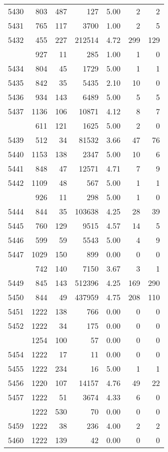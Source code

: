 \documentclass[
]{article}
\begin{document}
\begin{table}
\begin{tabular}[t]{lrrrrrr}
5430 & 803 & 487 & 127 & 5.00 & 2 & 2\\
5431 & 765 & 117 & 3700 & 1.00 & 2 & 5\\
5432 & 455 & 227 & 212514 & 4.72 & 299 & 129\\
\addlinespace
5433 & 927 & 11 & 285 & 1.00 & 1 & 0\\
5434 & 804 & 45 & 1729 & 5.00 & 1 & 1\\
5435 & 842 & 35 & 5435 & 2.10 & 10 & 0\\
5436 & 934 & 143 & 6489 & 5.00 & 5 & 5\\
5437 & 1136 & 106 & 10871 & 4.12 & 8 & 7\\
\addlinespace
5438 & 611 & 121 & 1625 & 5.00 & 2 & 0\\
5439 & 512 & 34 & 81532 & 3.66 & 47 & 76\\
5440 & 1153 & 138 & 2347 & 5.00 & 10 & 6\\
5441 & 848 & 47 & 12571 & 4.71 & 7 & 9\\
5442 & 1109 & 48 & 567 & 5.00 & 1 & 1\\
\addlinespace
5443 & 926 & 11 & 298 & 5.00 & 1 & 0\\
5444 & 844 & 35 & 103638 & 4.25 & 28 & 39\\
5445 & 760 & 129 & 9515 & 4.57 & 14 & 5\\
5446 & 599 & 59 & 5543 & 5.00 & 4 & 9\\
5447 & 1029 & 150 & 899 & 0.00 & 0 & 0\\
\addlinespace
5448 & 742 & 140 & 7150 & 3.67 & 3 & 1\\
5449 & 845 & 143 & 512396 & 4.25 & 169 & 290\\
5450 & 844 & 49 & 437959 & 4.75 & 208 & 110\\
5451 & 1222 & 138 & 766 & 0.00 & 0 & 0\\
5452 & 1222 & 34 & 175 & 0.00 & 0 & 0\\
\addlinespace
5453 & 1254 & 100 & 57 & 0.00 & 0 & 0\\
5454 & 1222 & 17 & 11 & 0.00 & 0 & 0\\
5455 & 1222 & 234 & 16 & 5.00 & 1 & 1\\
5456 & 1220 & 107 & 14157 & 4.76 & 49 & 22\\
5457 & 1222 & 51 & 3674 & 4.33 & 6 & 0\\
\addlinespace
5458 & 1222 & 530 & 70 & 0.00 & 0 & 0\\
5459 & 1222 & 38 & 236 & 4.00 & 2 & 2\\
5460 & 1222 & 139 & 42 & 0.00 & 0 & 0\\

\end{tabular}
\end{table}
\end{document}
